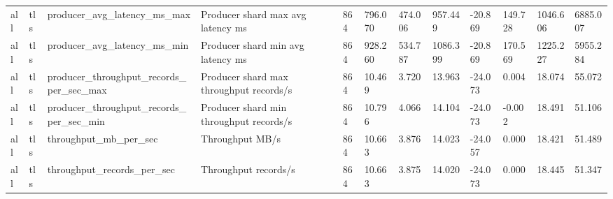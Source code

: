 \begin{longtable}{llllllllllll}
all & tls & producer\_avg\_latency\_ms\_max & Producer shard max avg latency ms & 864 & 796.070 & 474.006 & 957.449 & -20.869 & 149.728 & 1046.606 & 6885.007 \\
all & tls & producer\_avg\_latency\_ms\_min & Producer shard min avg latency ms & 864 & 928.260 & 534.787 & 1086.399 & -20.869 & 170.569 & 1225.227 & 5955.284 \\
all & tls & producer\_throughput\_records\_per\_sec\_max & Producer shard max throughput records/s & 864 & 10.469 & 3.720 & 13.963 & -24.073 & 0.004 & 18.074 & 55.072 \\
all & tls & producer\_throughput\_records\_per\_sec\_min & Producer shard min throughput records/s & 864 & 10.796 & 4.066 & 14.104 & -24.073 & -0.002 & 18.491 & 51.106 \\
all & tls & throughput\_mb\_per\_sec & Throughput MB/s & 864 & 10.663 & 3.876 & 14.023 & -24.057 & 0.000 & 18.421 & 51.489 \\
all & tls & throughput\_records\_per\_sec & Throughput records/s & 864 & 10.663 & 3.875 & 14.020 & -24.073 & 0.000 & 18.445 & 51.347 \\
\hline
\end{longtable}
